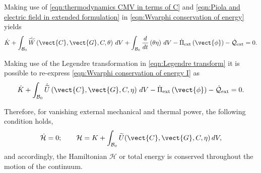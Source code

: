 Making use of \eqref{eqn:thermodynamics CMV in terms of C} and \eqref{eqn:Piola and electric field in extended formulation} in \eqref{eqn:Wvarphi conservation of energy} yields
%
\begin{equation}\label{eqn:Wvarphi conservation of energy I}
\begin{aligned}
\dot{K} + \int_{\mathcal{B}_0}\dot{\widetilde{W}}\left(\vect{C},\vect{G},C,\theta\right)\,dV 
%
+\int_{\mathcal{B}_0}\frac{d}{dt}\left(\theta\eta\right)\,dV -\dot{\Pi}_{\text{ext}}\left(\vect{\phi}\right) - \dot{\mathcal{Q}}_{\text{ext}} = 0.
%
\end{aligned}
\end{equation}


Making use of the Legendre transformation in \eqref{eqn:Legendre transform} it is possible to re-express \eqref{eqn:Wvarphi conservation of energy I} as
%
\begin{equation}\label{eqn:balance of energy final}
\dot{K} + \int_{\mathcal{B}_0}\dot{\widetilde{U}}\left(\vect{C},\vect{G},C,\eta\right)\,dV-\dot{\Pi}_{\text{ext}}\left(\vect{\phi}\right) - \dot{\mathcal{Q}}_{\text{ext}} = 0.
\end{equation}

Therefore, for vanishing external mechanical and thermal power, the following condition holds,
%
\begin{equation}\label{eqn:Hamiltonian}
\dot{\mathcal{H}}=0;\qquad
%
\mathcal{H} = K + \int_{\mathcal{B}_0}\widetilde{U}(\vect{C},\vect{G},C,\eta)\,dV,
\end{equation}
%
and accordingly, the {Hamiltonian $\mathcal{H}$ or total energy is conserved} throughout the motion of the continuum. 




